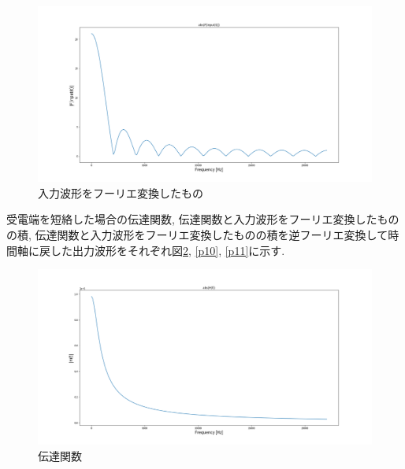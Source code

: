 \documentclass[a4j,12pt,]{jarticle}
\begin{document}
\begin{figure}[H]
  \begin{center}
    \includegraphics[width=160mm]{report/inputWaveformFFT.png}
    \caption{入力波形をフーリエ変換したもの}
    \label{p8}
  \end{center}
\end{figure}

受電端を短絡した場合の伝達関数, 伝達関数と入力波形をフーリエ変換したものの積, 伝達関数と入力波形をフーリエ変換したものの積を逆フーリエ変換して時間軸に戻した出力波形をそれぞれ図\ref{p9}, \ref{p10}, \ref{p11}に示す.

\begin{figure}[H]
  \begin{center}
    \includegraphics[width=160mm]{report/shortCircuitAtReceivingEndWithAttenuationConstant/frequencyTransferFunctionAbs.png}
    \caption{伝達関数}
    \label{p9}
  \end{center}
\end{figure}
\end{document}
